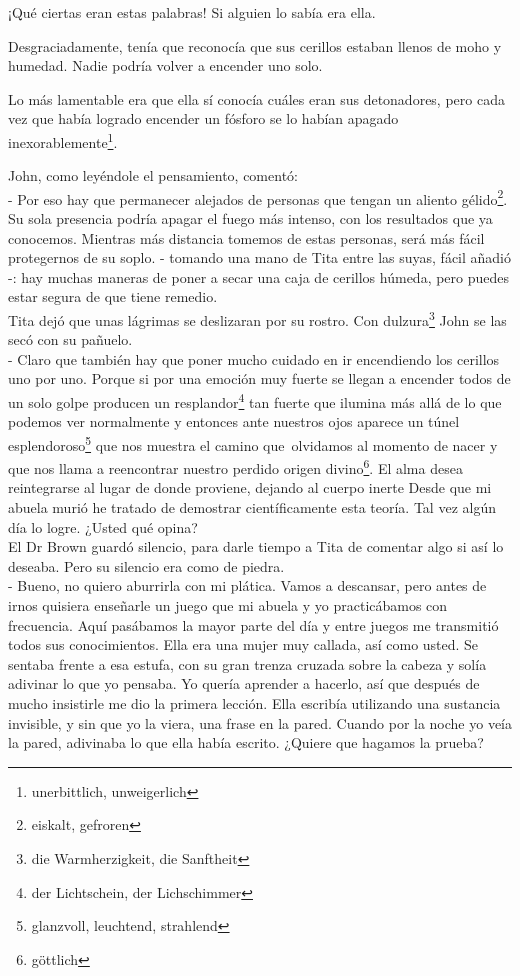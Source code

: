 ¡Qué ciertas eran estas palabras! Si alguien lo sabía era ella.

Desgraciadamente, tenía que reconocía que sus cerillos estaban llenos
de moho y humedad. Nadie podría volver a encender uno solo.

Lo más lamentable era que ella sí conocía cuáles eran sus detonadores,
pero cada vez que había logrado encender un fósforo se lo habían apagado inexorablemente\footnote{unerbittlich, unweigerlich}.

John, como leyéndole el pensamiento, comentó:
\\- Por eso hay que permanecer alejados de personas que tengan un aliento gélido\footnote{eiskalt, gefroren}. Su sola presencia podría apagar %
el fuego más intenso, con los resultados que ya conocemos. Mientras más %
distancia tomemos de estas personas, será más fácil protegernos de su %
soplo. - tomando una mano de Tita entre las suyas, fácil añadió -: %
hay muchas maneras de poner a secar una caja de cerillos húmeda, pero %
puedes estar segura de que tiene remedio.\\

Tita dejó que unas lágrimas se deslizaran por su rostro. Con dulzura\footnote{die Warmherzigkeit, die Sanftheit}
John se las secó con su pañuelo.
\\- Claro que también hay que poner mucho cuidado en ir encendiendo los %
cerillos uno por uno. Porque si por una emoción muy fuerte se llegan a %
encender todos de un solo golpe producen un resplandor\footnote{der Lichtschein, der Lichschimmer} %
tan fuerte que ilumina más allá de lo que podemos ver normalmente y %
entonces ante nuestros ojos aparece un túnel esplendoroso\footnote{glanzvoll, leuchtend, strahlend} %
que nos muestra el camino que~olvidamos al momento de nacer y que %
nos llama a reencontrar nuestro perdido origen divino\footnote{göttlich}. %
El alma desea reintegrarse al lugar de donde proviene, dejando al cuerpo %
inerte \ndots Desde que mi abuela %
murió he tratado de demostrar científicamente esta teoría. Tal vez algún %
día lo logre. ¿Usted qué opina?\\

El Dr Brown guardó silencio, para darle tiempo a Tita de comentar algo
si así lo deseaba. Pero su silencio era como de piedra.
\\- Bueno, no quiero aburrirla con mi plática. Vamos a descansar, pero %
antes de irnos quisiera enseñarle un juego que mi abuela y yo %
practicábamos con frecuencia. Aquí pasábamos la mayor parte del día y %
entre juegos me transmitió todos sus conocimientos. Ella era una mujer %
muy callada, así como usted. Se sentaba frente a esa estufa, con su gran %
trenza cruzada sobre la cabeza y solía adivinar lo que yo pensaba. Yo %
quería aprender a hacerlo, así que después de mucho insistirle me dio la %
primera lección. Ella escribía utilizando una sustancia invisible, y sin %
que yo la viera, una frase en la pared. Cuando por la noche yo veía la %
pared, adivinaba lo que ella había escrito. ¿Quiere que hagamos la %
prueba?\\

